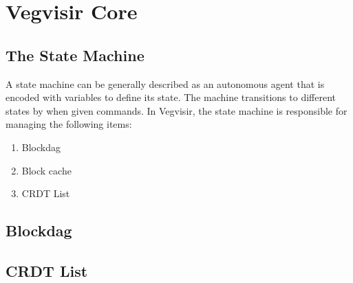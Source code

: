 
\chapter{Vegvisir Core}

\section{The State Machine}
\label{sec:1}
A state machine can be generally described as an autonomous agent that is
encoded with variables to define its state. The machine transitions to
different states by when given commands. In Vegvisir, the state machine is
responsible for managing the following items:
\begin{enumerate}
    \item Blockdag
    \item Block cache
    \item CRDT List
\end{enumerate}


\section{Blockdag}

\section{CRDT List}
